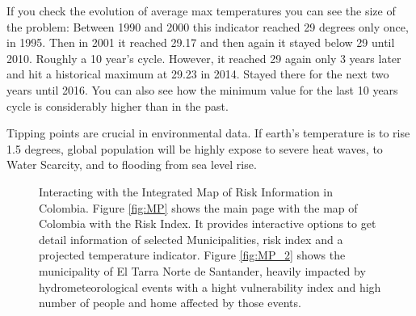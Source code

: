 If you check the evolution of average max temperatures you can see the size of the problem: Between 1990 and 2000 this indicator reached 29 degrees only once, in 1995. Then in 2001 it reached 29.17 and then again it stayed below 29 until 2010. Roughly a 10 year's cycle. However, it reached 29 again only 3 years later and hit a historical maximum at 29.23 in 2014. Stayed there for the next two years until 2016. You can also see how the minimum value for the last 10 years cycle is considerably higher than in the past.

Tipping points are crucial in environmental data. If earth's temperature is to rise 1.5 degrees, global population will be highly expose to severe heat waves, to Water Scarcity, and to flooding from sea level rise.



\begin{figure}%
\centering
{}%
\qquad
{}%
\caption{Interacting with the Integrated Map of Risk Information in Colombia. Figure \ref{fig:MP} shows the main page with the  map of Colombia with the Risk Index. It provides interactive options to get detail information of selected Municipalities, risk index and a projected temperature indicator. Figure \ref{fig:MP_2} shows the municipality of El Tarra Norte de Santander, heavily impacted by hydrometeorological events with a hight vulnerability index and high number of people and home affected by those events.} 

\label{fig:page}%
\end{figure}


